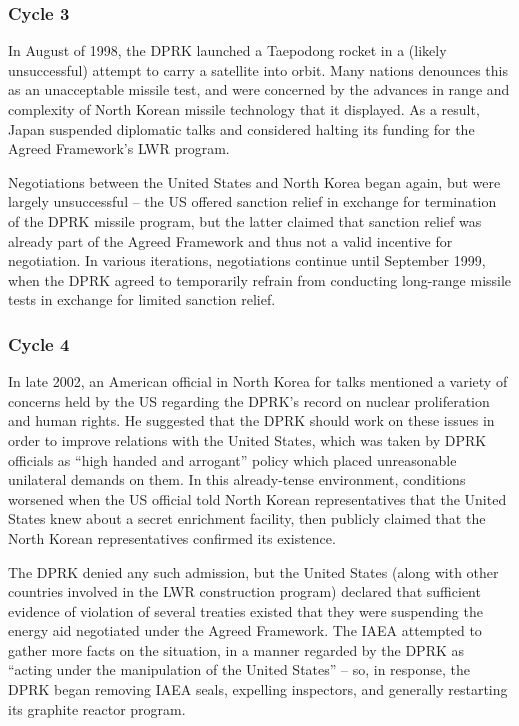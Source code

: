 \documentclass{article}
\begin{document}
\subsubsection{Cycle 3}

In August of 1998, the DPRK launched a Taepodong rocket in a (likely unsuccessful) attempt to carry a satellite into orbit\cite{orfall}. Many nations denounces this as an unacceptable missile test, and were concerned by the advances in range and complexity of North Korean missile technology that it displayed\cite{orfall}. As a result, Japan suspended diplomatic talks and considered halting its funding for the Agreed Framework’s LWR program\cite{orfall}.

Negotiations between the United States and North Korea began again, but were largely unsuccessful – the US offered sanction relief in exchange for termination of the DPRK missile program, but the latter claimed that sanction relief was already part of the Agreed Framework and thus not a valid incentive for negotiation\cite{davenport}. In various iterations, negotiations continue until September 1999, when the DPRK agreed to temporarily refrain from conducting long-range missile tests in exchange for limited sanction relief\cite{davenport}.

\subsubsection{Cycle 4}

In late 2002, an American official in North Korea for talks mentioned a variety of concerns held by the US regarding the DPRK’s record on nuclear proliferation and human rights\cite{davenport}. He suggested that the DPRK should work on these issues in order to improve relations with the United States, which was taken by DPRK officials as “high handed and arrogant” policy which placed unreasonable unilateral demands on them\cite{kcna3}. In this already-tense environment, conditions worsened when the US official told North Korean representatives that the United States knew about a secret enrichment facility, then publicly claimed that the North Korean representatives confirmed its existence\cite{davenport}. 

The DPRK denied any such admission, but the United States (along with other countries involved in the LWR construction program) declared that sufficient evidence of violation of several treaties existed that they were suspending the energy aid negotiated under the Agreed Framework\cite{iaea09}. The IAEA attempted to gather more facts on the situation, in a manner regarded by the DPRK as “acting under the manipulation of the United States”\cite{hurriyet} – so, in response, the DPRK began removing IAEA seals, expelling inspectors, and generally restarting its graphite reactor program\cite{iaea09}.
\end{document}
